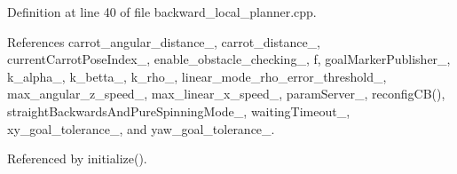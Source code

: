 Definition at line 40 of file backward\+\_\+local\+\_\+planner.\+cpp.



References carrot\+\_\+angular\+\_\+distance\+\_\+, carrot\+\_\+distance\+\_\+, current\+Carrot\+Pose\+Index\+\_\+, enable\+\_\+obstacle\+\_\+checking\+\_\+, f, goal\+Marker\+Publisher\+\_\+, k\+\_\+alpha\+\_\+, k\+\_\+betta\+\_\+, k\+\_\+rho\+\_\+, linear\+\_\+mode\+\_\+rho\+\_\+error\+\_\+threshold\+\_\+, max\+\_\+angular\+\_\+z\+\_\+speed\+\_\+, max\+\_\+linear\+\_\+x\+\_\+speed\+\_\+, param\+Server\+\_\+, reconfig\+C\+B(), straight\+Backwards\+And\+Pure\+Spinning\+Mode\+\_\+, waiting\+Timeout\+\_\+, xy\+\_\+goal\+\_\+tolerance\+\_\+, and yaw\+\_\+goal\+\_\+tolerance\+\_\+.



Referenced by initialize().


